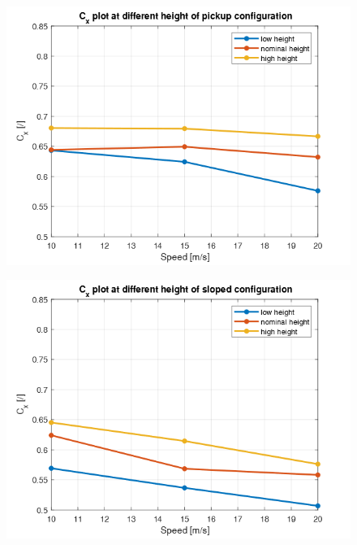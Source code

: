 \documentclass{elbioimp2}
\begin{document}
\begin{figure}[htp]
      \centering
      \includegraphics[width=1\columnwidth]{cxpickup.png}
    \end{figure}
    \begin{figure}[htp]
      \centering
      \includegraphics[width=1\columnwidth]{cxsloped.png}
    \end{figure}
\end{document}
